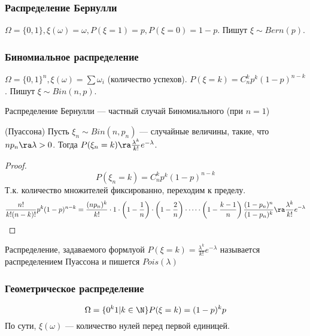\subsubsection{Распределение Бернулли}
\(\Omega = \{0, 1\}, \xi(\omega) = \omega, P(\xi = 1) = p, P(\xi = 0) = 1 - p\). Пишут \(\xi \sim Bern(p)\).

\subsubsection{Биномиальное распределение}
\(\Omega = \{0, 1\}^n, \xi(\omega) = \sum \omega_i\) (количество успехов). \(P(\xi = k) = C_n^kp^k(1-p)^{n - k}\). Пишут \(\xi \sim Bin(n, p)\).

\begin{note}
    Распределение Бернулли --- частный случай Биномиального (при \(n = 1\))
\end{note}

\begin{theorem}(Пуассона)
    Пусть \(\xi_n \sim Bin(n, p_n)\) --- случайные величины, такие, что \(np_n \ra \lambda > 0\). Тогда \(P(\xi_n = k) \ra \frac{\lambda^k}{k!}e^{-\lambda}\).
\end{theorem}
\begin{proof}
    \[P(\xi_n = k) = C_n^kp^k(1-p)^{n - k}\]
    Т.к. количество множителей фиксированно, переходим к пределу.
    \[\frac{n!}{k!(n-k)!}p^k(1-p)^{n - k} = \frac{(np_n)^k}{k!}\cdot1\cdot\left(1 - \frac{1}{n}\right) \cdot\left(1 - \frac{2}{n}\right)\cdot\dots\cdot\left(1 - \frac{k - 1}{n}\right)\frac{(1 - p_n)^n}{(1 - p_n)^k} \ra \frac{\lambda^k}{k!}e^{-\lambda}\]
\end{proof}

\begin{definition}
    Распределение, задаваемого формлуой \(P(\xi = k) = \frac{\lambda^k}{k!}e^{-\lambda}\) называется распределением Пуассона и пишется \(Pois(\lambda)\)
\end{definition}

\subsubsection{Геометрическое распределение}
\[\Omega = \{0^k1 | k \in \N\} P(\xi = k) = (1 - p)^kp\]
По сути, \(\xi(\omega)\) --- количество нулей перед первой единицей.